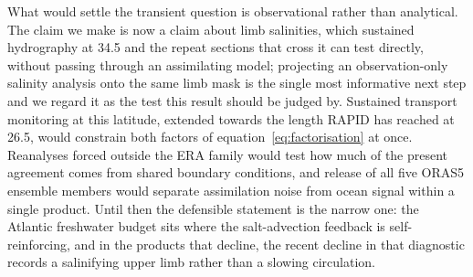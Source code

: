 What would settle the transient question is observational rather than
analytical. The claim we make is now a claim about limb salinities, which
sustained hydrography at 34.5\degS{} and the repeat sections that cross it can
test directly, without passing through an assimilating model; projecting an
observation-only salinity analysis onto the same limb mask is the single most
informative next step and we regard it as the test this result should be judged
by. Sustained transport monitoring at this latitude, extended towards the length
RAPID has reached at 26.5\degN{}, would constrain both factors of
equation~\eqref{eq:factorisation} at once. Reanalyses forced outside the ERA
family would test how much of the present agreement comes from shared boundary
conditions, and release of all five ORAS5 ensemble members would separate
assimilation noise from ocean signal within a single product. Until then the
defensible statement is the narrow one: the Atlantic freshwater budget sits
where the salt-advection feedback is self-reinforcing, and in the products that
decline, the recent decline in that diagnostic records a salinifying upper limb
rather than a slowing circulation.
